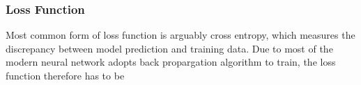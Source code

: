 \subsubsection{Loss Function}

Most common form of loss function is arguably cross entropy, which measures the discrepancy between model prediction and training data. Due to most of the modern neural network adopts back propargation algorithm to train, the loss function therefore has to be 